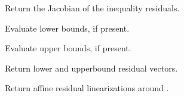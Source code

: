 \documentclass[letterpaper,10pt,english,openany,oneside]{sphinxmanual}
\begin{document}
\begin{fulllineitems}
\begin{fulllineitems}
\end{fulllineitems}



\begin{fulllineitems}

\pysigstartsignatures
{}
\pysigstopsignatures
\sphinxAtStartPar
Return the Jacobian of the inequality residuals.

\end{fulllineitems}



\begin{fulllineitems}

\pysigstartsignatures
{}
\pysigstopsignatures
\sphinxAtStartPar
Evaluate lower bounds, if present.

\end{fulllineitems}



\begin{fulllineitems}

\pysigstartsignatures
{}
\pysigstopsignatures
\sphinxAtStartPar
Evaluate upper bounds, if present.

\end{fulllineitems}



\begin{fulllineitems}

\pysigstartsignatures
{}
\pysigstopsignatures
\sphinxAtStartPar
Return lower\sphinxhyphen{} and upper\sphinxhyphen{}bound residual vectors.

\end{fulllineitems}



\begin{fulllineitems}

\pysigstartsignatures
{}
\pysigstopsignatures
\sphinxAtStartPar
Return affine residual linearizations around .


\end{fulllineitems}
\end{fulllineitems}
\end{document}
